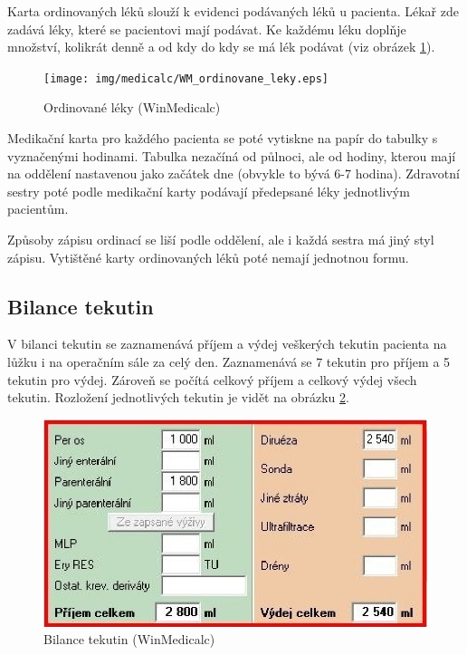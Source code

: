 Karta ordinovaných léků slouží k evidenci podávaných léků u pacienta. Lékař zde zadává léky, které se pacientovi mají podávat. Ke každému léku doplňje množství, kolikrát denně a od kdy do kdy se má lék podávat (viz obrázek \ref{fig:WM_ordinovane_leky}).

\begin{figure}[H]
	\centering
	\texttt{[image: img/medicalc/WM\_ordinovane\_leky.eps]}
	\caption{Ordinované léky (WinMedicalc)}
  \label{fig:WM_ordinovane_leky}
\end{figure}

Medikační karta pro každého pacienta se poté vytiskne na papír do tabulky s vyznačenými hodinami. Tabulka nezačíná od půlnoci, ale od hodiny, kterou mají na oddělení nastavenou jako začátek dne (obvykle to bývá 6-7 hodina). Zdravotní sestry poté podle medikační karty podávají předepsané léky jednotlivým pacientům.

Způsoby zápisu ordinací se liší podle oddělení, ale i každá sestra má jiný styl zápisu. Vytištěné karty ordinovaných léků poté nemají jednotnou formu.

\subsection{Bilance tekutin}

V bilanci tekutin se zaznamenává příjem a výdej veškerých tekutin pacienta na lůžku i na operačním sále za celý den. Zaznamenává se 7 tekutin pro příjem a 5 tekutin pro výdej. Zároveň se počítá celkový příjem a celkový výdej všech tekutin. Rozložení jednotlivých tekutin je vidět na obrázku \ref{fig:WM_bilance_tekutin}.

\begin{figure}[H]
	\centering
	\includegraphics{img/medicalc/WM_bilance_tekutin.eps}
	\caption{Bilance tekutin (WinMedicalc)}
  \label{fig:WM_bilance_tekutin}
\end{figure}


